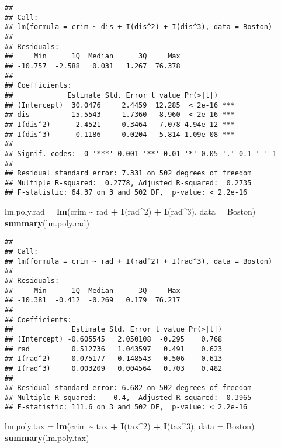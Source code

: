 \documentclass[
]{article}
\newenvironment{Shaded}{\begin{snugshade}}{\end{snugshade}}
\newcommand{\AttributeTok}[1]{\textcolor[rgb]{0.13,0.29,0.53}{#1}}
\newcommand{\DecValTok}[1]{\textcolor[rgb]{0.00,0.00,0.81}{#1}}
\newcommand{\FunctionTok}[1]{\textcolor[rgb]{0.13,0.29,0.53}{\textbf{#1}}}
\newcommand{\NormalTok}[1]{#1}
\newcommand{\OtherTok}[1]{\textcolor[rgb]{0.56,0.35,0.01}{#1}}
\newcommand{\SpecialCharTok}[1]{\textcolor[rgb]{0.81,0.36,0.00}{\textbf{#1}}}
\begin{document}
\begin{verbatim}
## 
## Call:
## lm(formula = crim ~ dis + I(dis^2) + I(dis^3), data = Boston)
## 
## Residuals:
##     Min      1Q  Median      3Q     Max 
## -10.757  -2.588   0.031   1.267  76.378 
## 
## Coefficients:
##             Estimate Std. Error t value Pr(>|t|)    
## (Intercept)  30.0476     2.4459  12.285  < 2e-16 ***
## dis         -15.5543     1.7360  -8.960  < 2e-16 ***
## I(dis^2)      2.4521     0.3464   7.078 4.94e-12 ***
## I(dis^3)     -0.1186     0.0204  -5.814 1.09e-08 ***
## ---
## Signif. codes:  0 '***' 0.001 '**' 0.01 '*' 0.05 '.' 0.1 ' ' 1
## 
## Residual standard error: 7.331 on 502 degrees of freedom
## Multiple R-squared:  0.2778, Adjusted R-squared:  0.2735 
## F-statistic: 64.37 on 3 and 502 DF,  p-value: < 2.2e-16
\end{verbatim}

\begin{Shaded}
\begin{Highlighting}[]
\NormalTok{lm.poly.rad }\OtherTok{=} \FunctionTok{lm}\NormalTok{(crim }\SpecialCharTok{\textasciitilde{}}\NormalTok{ rad }\SpecialCharTok{+} \FunctionTok{I}\NormalTok{(rad}\SpecialCharTok{\^{}}\DecValTok{2}\NormalTok{) }\SpecialCharTok{+} \FunctionTok{I}\NormalTok{(rad}\SpecialCharTok{\^{}}\DecValTok{3}\NormalTok{), }\AttributeTok{data =}\NormalTok{ Boston)}
\FunctionTok{summary}\NormalTok{(lm.poly.rad)}
\end{Highlighting}
\end{Shaded}

\begin{verbatim}
## 
## Call:
## lm(formula = crim ~ rad + I(rad^2) + I(rad^3), data = Boston)
## 
## Residuals:
##     Min      1Q  Median      3Q     Max 
## -10.381  -0.412  -0.269   0.179  76.217 
## 
## Coefficients:
##              Estimate Std. Error t value Pr(>|t|)
## (Intercept) -0.605545   2.050108  -0.295    0.768
## rad          0.512736   1.043597   0.491    0.623
## I(rad^2)    -0.075177   0.148543  -0.506    0.613
## I(rad^3)     0.003209   0.004564   0.703    0.482
## 
## Residual standard error: 6.682 on 502 degrees of freedom
## Multiple R-squared:    0.4,  Adjusted R-squared:  0.3965 
## F-statistic: 111.6 on 3 and 502 DF,  p-value: < 2.2e-16
\end{verbatim}

\begin{Shaded}
\begin{Highlighting}[]
\NormalTok{lm.poly.tax }\OtherTok{=} \FunctionTok{lm}\NormalTok{(crim }\SpecialCharTok{\textasciitilde{}}\NormalTok{ tax }\SpecialCharTok{+} \FunctionTok{I}\NormalTok{(tax}\SpecialCharTok{\^{}}\DecValTok{2}\NormalTok{) }\SpecialCharTok{+} \FunctionTok{I}\NormalTok{(tax}\SpecialCharTok{\^{}}\DecValTok{3}\NormalTok{), }\AttributeTok{data =}\NormalTok{ Boston)}
\FunctionTok{summary}\NormalTok{(lm.poly.tax)}
\end{Highlighting}
\end{Shaded}
\end{document}
